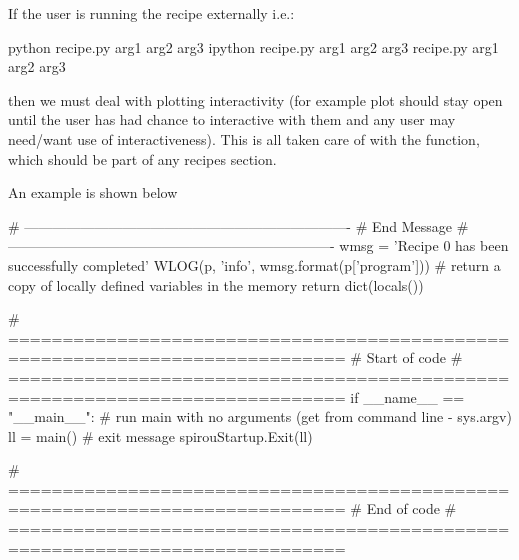 If the user is running the recipe externally i.e.:
\begin{cmdbox}
python recipe.py arg1 arg2 arg3
ipython recipe.py arg1 arg2 arg3
recipe.py arg1 arg2 arg3
\end{cmdbox}
\noindent then we must deal with plotting interactivity (for example plot should stay open until the user has had chance to interactive with them and any user may need/want use of interactiveness). This is all taken care of with the \spirouStartup{} function, which should be part of any recipes  section. \\

\vspace{0.5cm}
\begin{minipage}{\textwidth}
\noindent An example is shown below
\begin{pythonbox}
# ----------------------------------------------------------------------
# End Message
# ----------------------------------------------------------------------
wmsg = 'Recipe {0} has been successfully completed'
WLOG(p, 'info', wmsg.format(p['program']))
    # return a copy of locally defined variables in the memory
    return dict(locals())

# =============================================================================
# Start of code
# =============================================================================
if __name__ == "__main__":
    # run main with no arguments (get from command line - sys.argv)
    ll = main()
    # exit message
    spirouStartup.Exit(ll)

# =============================================================================
# End of code
# =============================================================================
\end{pythonbox}
\end{minipage}

\clearpage
\newpage
\fi